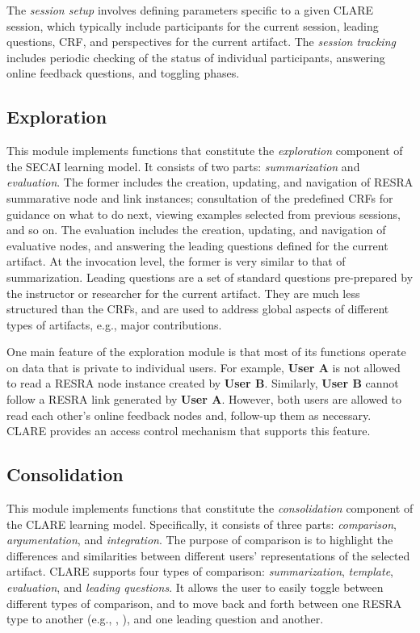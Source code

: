 The {\it session setup\/} involves defining parameters specific to a given
CLARE session, which typically include participants for the current
session, leading questions, CRF, and perspectives for the current artifact.
The {\it session tracking\/} includes periodic checking of the status of
individual participants, answering online feedback questions, and toggling
phases.


\subsection{Exploration}
\label{sec:exploration}

This module implements functions that constitute the {\it exploration\/}
component of the SECAI learning model. It consists of two parts: {\it
summarization\/} and {\it evaluation\/}. The former includes the creation,
updating, and navigation of RESRA summarative node and link instances;
consultation of the predefined CRFs for guidance on what to do next,
viewing examples selected from previous sessions, and so on.  The
evaluation includes the creation, updating, and navigation of evaluative
nodes, and answering the leading questions defined for the current
artifact. At the invocation level, the former is very similar to that of
summarization. Leading questions are a set of standard questions
pre-prepared by the instructor or researcher for the current artifact. They
are much less structured than the CRFs, and are used to address global
aspects of different types of artifacts, e.g., major contributions.

One main feature of the exploration module is that most of its functions
operate on data that is private to individual users. For example, {\bf User
A} is not allowed to read a RESRA node instance created by {\bf User B}.
Similarly, {\bf User B} cannot follow a RESRA link generated by {\bf User
A}. However, both users are allowed to read each other's online feedback
nodes and, follow-up them as necessary. CLARE provides an access control
mechanism that supports this feature.


\subsection{Consolidation}
\label{sec:consolidation}

This module implements functions that constitute the {\it consolidation\/}
component of the CLARE learning model. Specifically, it consists of three
parts: {\it comparison\/}, {\it argumentation\/}, and {\it integration\/}.
The purpose of comparison is to highlight the differences and similarities
between different users' representations of the selected artifact. CLARE
supports four types of comparison: {\it summarization\/}, {\it template\/},
{\it evaluation\/}, and {\it leading questions\/}. It allows the user to
easily toggle between different types of comparison, and to move back and
forth between one RESRA type to another (e.g., ,
), and one leading question and another.

